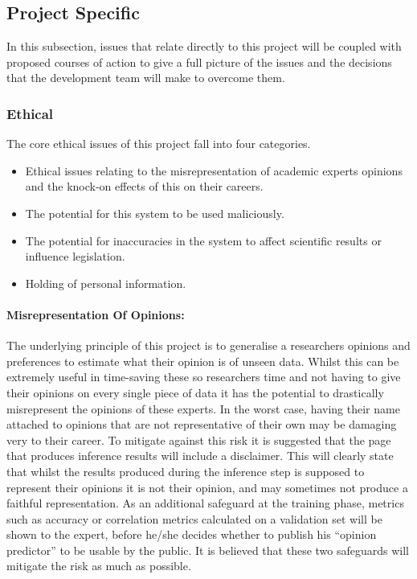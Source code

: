 \documentclass{ecmm427_assignment}
\begin{document}
\subsection{Project Specific}

\quad In this subsection, issues that relate directly to this project will
be coupled with proposed courses of action to give a full picture
of the issues and the decisions that the development team will make
to overcome them. 

\subsubsection{Ethical}

The core ethical issues of this project fall into four categories. 
\begin{itemize}
\item Ethical issues relating to the misrepresentation of academic experts
opinions and the knock-on effects of this on their careers.
\item The potential for this system to be used maliciously.
\item The potential for inaccuracies in the system to affect scientific
results or influence legislation. 
\item Holding of personal information.
\end{itemize}

\paragraph{Misrepresentation Of Opinions:}

\quad The underlying principle of this project is to generalise a researchers
opinions and preferences to estimate what their opinion is of unseen
data. Whilst this can be extremely useful in time-saving these so
researchers time and not having to give their opinions on every single
piece of data it has the potential to drastically misrepresent the
opinions of these experts. In the worst case, having their name attached
to opinions that are not representative of their own may be damaging
very to their career. To mitigate against this risk it is suggested
that the page that produces inference results will include a disclaimer. This will clearly state that whilst the results produced during the inference
step is supposed to represent their opinions it is not their opinion,
and may sometimes not produce a faithful representation. As an additional
safeguard at the training phase, metrics such as accuracy or correlation
metrics calculated on a validation set will be shown to the expert,
before he/she decides whether to publish his ``opinion predictor''
to be usable by the public. It is believed that these two safeguards
will mitigate the risk as much as possible.\\
\end{document}
